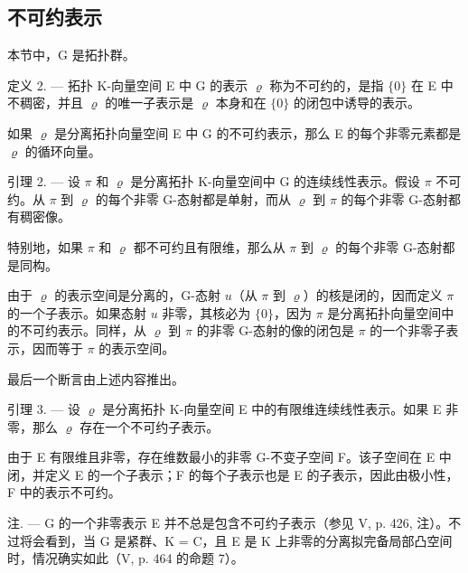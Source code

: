 \subsection{不可约表示}

本节中，G 是拓扑群。

定义 2. --- 拓扑 K-向量空间 E 中 G 的表示 \(\varrho\) 称为不可约的，是指 \(\{0\}\) 在 E 中不稠密，并且 \(\varrho\) 的唯一子表示是 \(\varrho\) 本身和在 \(\{0\}\) 的闭包中诱导的表示。

如果 \(\varrho\) 是分离拓扑向量空间 E 中 G 的不可约表示，那么 E 的每个非零元素都是 \(\varrho\) 的循环向量。

引理 2. --- 设 \(\pi\) 和 \(\varrho\) 是分离拓扑 K-向量空间中 G 的连续线性表示。假设 \(\pi\) 不可约。从 \(\pi\) 到 \(\varrho\) 的每个非零 G-态射都是单射，而从 \(\varrho\) 到 \(\pi\) 的每个非零 G-态射都有稠密像。

特别地，如果 \(\pi\) 和 \(\varrho\) 都不可约且有限维，那么从 \(\pi\) 到 \(\varrho\) 的每个非零 G-态射都是同构。

由于 \(\varrho\) 的表示空间是分离的，G-态射 \(u\)（从 \(\pi\) 到 \(\varrho\)）的核是闭的，因而定义 \(\pi\) 的一个子表示。如果态射 \(u\) 非零，其核必为 \(\{0\}\)，因为 \(\pi\) 是分离拓扑向量空间中的不可约表示。同样，从 \(\varrho\) 到 \(\pi\) 的非零 G-态射的像的闭包是 \(\pi\) 的一个非零子表示，因而等于 \(\pi\) 的表示空间。

最后一个断言由上述内容推出。

引理 3. --- 设 \(\varrho\) 是分离拓扑 K-向量空间 E 中的有限维连续线性表示。如果 E 非零，那么 \(\varrho\) 存在一个不可约子表示。

由于 E 有限维且非零，存在维数最小的非零 G-不变子空间 F。该子空间在 E 中闭，并定义 E 的一个子表示；F 的每个子表示也是 E 的子表示，因此由极小性，F 中的表示不可约。

注. --- G 的一个非零表示 E 并不总是包含不可约子表示（参见 V, p. 426, 注）。不过将会看到，当 G 是紧群、K = C，且 E 是 K 上非零的分离拟完备局部凸空间时，情况确实如此（V, p. 464 的命题 7）。

